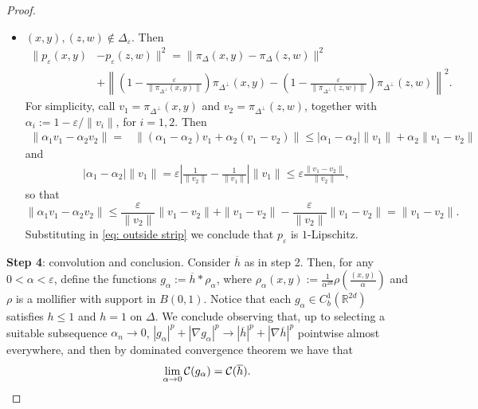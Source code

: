 \documentclass[10pt,leqno]{amsart}
\numberwithin{equation}{section}
\newcommand{\R}{\mathbb{R}}
\begin{document}
\begin{proof}
\begin{itemize}
        \item $(x,y),(z,w) \notin \Delta_\varepsilon$. Then 
        \begin{equation}\label{eq: outside strip}
        \begin{aligned}
            \|p_\varepsilon(x,y) & - p_\varepsilon(z,w)\|^2 
            = 
            \|\pi_{\Delta}(x,y) - \pi_{\Delta}(z,w)\|^2
            \\
            & + \left\|\left(1 - \frac{\varepsilon}{\|\pi_{\Delta^\perp}(x,y) \|}\right)\pi_{\Delta^\perp}(x,y) - \left(1 - \frac{\varepsilon}{\|\pi_{\Delta^\perp}(z,w) \|}\right)\pi_{\Delta^\perp}(z,w)\right\|^2.
        \end{aligned}
        \end{equation}
        For simplicity, call $v_1 =\pi_{\Delta^\perp}(x,y)$ and $v_2 =\pi_{\Delta^\perp}(z,w)$, together with $\alpha_i := 1- \varepsilon/\|v_i\|$, for $i=1,2$. Then
        \begin{align*}
            \|\alpha_1 v_1 - \alpha_2 v_2\| = & 
            \|(\alpha_1-\alpha_2)v_1 + \alpha_2 (v_1 - v_2)\|
            \leq 
            |\alpha_1 - \alpha_2|\|v_1\| + \alpha_2 \|v_1 - v_2\|
        \end{align*}
        and 
        \begin{align*}
            |\alpha_1 - \alpha_2|\|v_1\| = \varepsilon\left|\frac{1}{\|v_2\|} - \frac{1}{\|v_1\|}\right|\|v_1\|\leq\varepsilon \frac{\|v_1-v_2\|}{\|v_2\|},
        \end{align*}
        so that 
        \[\|\alpha_1 v_1 - \alpha_2 v_2\| \leq \frac{\varepsilon}{\|v_2\|}\|v_1 - v_2\| + \|v_1-v_2\| - \frac{\varepsilon}{\|v_2\|}\|v_1-v_2\| = \|v_1-v_2\|.\]
        Substituting in \eqref{eq: outside strip} we conclude that $p_\varepsilon$ is $1$-Lipschitz.
    \end{itemize}

    \textbf{Step 4}: convolution and conclusion. Consider $\overline{h}$ as in step 2. Then, for any $0 <\alpha < \varepsilon$, define the functions $g_\alpha:= \overline{h} * \rho_\alpha$, where $\rho_\alpha(x,y) := \frac{1}{\alpha^{2d}}\rho\left(\frac{(x,y)}{\alpha}\right)$ and $\rho$ is a mollifier with support in $B(0,1)$. Notice that each $g_\alpha\in C_b^1(\R^{2d})$ satisfies $h\leq 1$ and $h = 1$ on $\Delta$. We conclude observing that, up to selecting a suitable subsequence $\alpha_n \to 0$, $|g_\alpha|^p + |\nabla g_\alpha|^p \to |\overline{h}|^p + |\nabla \overline{h}|^p$ pointwise almost everywhere, and then by dominated convergence theorem we have that 
    \[\lim_{\alpha \to 0}\mathcal{C}(g_\alpha) = \mathcal{C}(\overline{h}). \qedhere \]
\end{proof}
\end{document}
